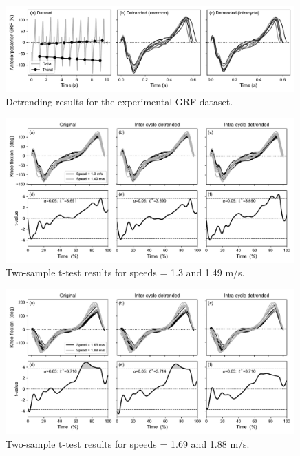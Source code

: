 \begin{figure}[h]
\begin{center}
	\includegraphics[width=0.99\textwidth]{./figs/fig_results_detrend.pdf}\vspace{0mm}
	\caption[Dummy caption.]{Detrending results for the experimental GRF dataset.}
	\label{fig:results_detrend}
\end{center}
\end{figure}



\begin{figure}[h]
\begin{center}
	\includegraphics[width=0.99\textwidth]{./figs/fig_spm_01.pdf}\vspace{0mm}
	\caption[Dummy caption.]{Two-sample t-test results for speeds = 1.3 and 1.49 m/s.}
	\label{fig:spm01}
\end{center}
\end{figure}


\begin{figure}[h]
\begin{center}
	\includegraphics[width=0.99\textwidth]{./figs/fig_spm_23.pdf}\vspace{0mm}
	\caption[Dummy caption.]{Two-sample t-test results for speeds = 1.69 and 1.88 m/s.}
	\label{fig:spm23}
\end{center}
\end{figure}
